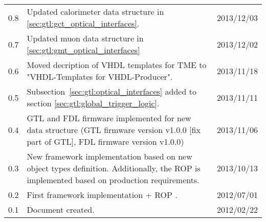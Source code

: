 \begin{longtable}{|c|p{}|c|}
0.8 & Updated calorimeter data structure in \ref{sec:gtl:gct_optical_interfaces}. & 2013/12/03\\
0.7 & Updated muon data structure in \ref{sec:gtl:gmt_optical_interfaces} & 2013/12/02\\
0.6 & Moved decription of VHDL templates for TME to "VHDL-Templates for VHDL-Producer". & 2013/11/18\\
0.5 & Subsection~\ref{sec:gtl:optical_interfaces} added to section \ref{sec:gtl:global_trigger_logic}. & 2013/11/11\\
0.4 & GTL and FDL firmware implemented for new data structure (GTL firmware version v1.0.0 [fix part of GTL], FDL firmware version v1.0.0) & 2013/11/06\\
0.3 & New framework implementation based on new object types definition. Additionally, the ROP is implemented based on production requirements. & 2013/10/13\\
0.2 & First framework implementation + ROP . & 2012/07/01\\
0.1 & Document created. & 2012/02/22\\
\hline
\end{longtable}

\clearpage{}
